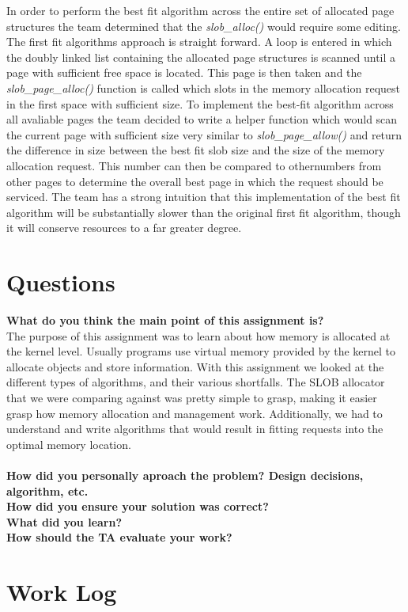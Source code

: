 \documentclass[10pt,onecolumn,draftclsnofoot]{IEEEtran} %
\begin{document}
\begin{singlespace}
  \normalfont \indent In order to perform the best fit algorithm across the entire set of allocated page structures the team determined that the \textit{slob\_alloc()} would require some editing. The first fit algorithms approach is straight forward. A loop is entered in which the doubly linked list containing the allocated page structures is scanned until a page with sufficient free space is located. This page is then taken and the \textit{slob\_page\_alloc()} function is called which slots in the memory allocation request in the first space with sufficient size. To implement the best-fit algorithm across all avaliable pages the team decided to write a helper function which would scan the current page with sufficient size very similar to \textit{slob\_page\_allow()} and return the difference in size between the best fit slob size and the size of the memory allocation request. This number can then be compared to othernumbers from other pages to determine the overall best page in which the request should be serviced. The team has a strong intuition that this implementation of the best fit algorithm will be substantially slower than the original first fit algorithm, though it will conserve resources to a far greater degree.  

\section{\bf Questions}
        \textbf{What do you think the main point of this assignment is?}\\
                \normalfont \indent The purpose of this assignment was to learn about how memory is allocated at the kernel level. Usually programs use virtual memory provided by the kernel to allocate objects and store information.  With this assignment we looked at the different types of algorithms, and their various shortfalls.  The SLOB allocator that we were comparing against was pretty simple to grasp, making it easier grasp how memory allocation and management work. Additionally, we had to understand and write algorithms that would result in fitting requests into the optimal memory location. \\\\
       \textbf{How did you personally aproach the problem? Design decisions, algorithm, etc.}\\
	  		\normalfont \indent 
	  \textbf{How did you ensure your solution was correct?}\\
                \normalfont \indent   
               \textbf{What did you learn?}\\
        		\normalfont \indent
        \textbf{How should the TA evaluate your work?}\\
	\section{\bf Work Log}

                

\newpage


\end{singlespace}
\restoregeometry
\end{document}
